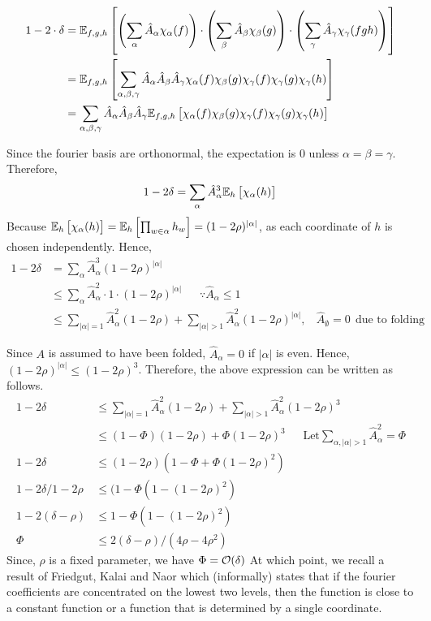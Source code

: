 \begin{align*}
  1 - 2 \cdot \delta  &= {\mathbb{E}}_{f,g,h}\left[\left(\sum_\alpha \hat{A}_\alpha\chi_\alpha(f) \right) \cdot \left(\sum_\beta \hat{A}_\beta\chi_\beta(g) \right) \cdot \left(\sum_\gamma \hat{A}_\gamma\chi_\gamma(fgh)\right)\right]\\
 &={\mathbb{E}}_{f,g,h}\left[\sum_{\alpha,\beta,\gamma}\hat{A}_\alpha\hat{A}_\beta\hat{A}_\gamma\chi_\alpha(f) \chi_\beta(g) \chi_\gamma(f) \chi_\gamma(g) \chi_{\gamma}(h)\right]\\
 &= \sum_{\alpha,\beta,\gamma}\hat{A}_\alpha \hat{A}_\beta \hat{A}_\gamma {\mathbb{E}}_{f,g,h}\left[\chi_\alpha(f) \chi_{\beta}(g) \chi_{\gamma}(f) \chi_{\gamma}(g) \chi_{\gamma}(h)\right]
\end{align*}

\noindent Since the fourier basis are orthonormal, the expectation is $0$ unless $\alpha = \beta = \gamma$. Therefore,
\[
1 - 2\delta = \sum_\alpha \hat{A}_\alpha^3 {\mathbb{E}}_{h}\left[\chi_\alpha(h)\right]\\
\]
\noindent Because ${\mathbb{E}}_{h}\left[\chi_\alpha(h)\right] = {\mathbb{E}}_{h}\left[\prod_{w \in
    \alpha}h_w\right] = (1 - 2\rho)^{|\alpha|}$, as each coordinate of $h$ is
chosen independently. Hence,
\begin{align*}
  1 - 2 \delta &= \sum_{\alpha} \hat{A}_\alpha^3 (1 - 2\rho)^{|\alpha|} \\
  &\le \sum_{\alpha} \hat{A}_\alpha^2 \cdot 1 \cdot (1 - 2\rho)^{|\alpha|} \ \ \ \ \  \ \  \because \hat{A}_\alpha \le 1\\
  &\le \sum_{|\alpha| =1} \hat{A}_\alpha^2 (1 - 2\rho) + \sum_{|\alpha| > 1} \hat{A}_\alpha^2 (1 - 2\rho)^{|\alpha|}, \ \ \  \ \hat{A}_\emptyset = 0 \ \ \mbox{due to folding}
 \end{align*}

 \noindent Since $A$ is assumed to have been folded, $\hat{A}_{\alpha}
 = 0$ if $|\alpha|$ is even. Hence, $(1 - 2\rho)^{|\alpha|} \le (1 -
 2\rho)^{3}$.  Therefore, the above expression can be written as follows.
\begin{align*}
  1 - 2\delta &\le \sum_{|\alpha| =1} \hat{A}_\alpha^2 (1 - 2\rho) + \sum_{|\alpha| > 1} \hat{A}_\alpha^2 (1 - 2\rho)^{3} \\
  & \le (1 -\Phi) (1 - 2\rho) + \Phi ( 1 - 2\rho)^{3} \ \ \ \  \ \ \
  \mbox{Let} \sum_{\alpha, |\alpha| > 1}\hat{A}^2_\alpha = \Phi\\
 1 - 2\delta &\le (1 - 2\rho) (1 - \Phi + \Phi (1 -2 \rho)^2) \\
{1 - 2\delta}/{1 - 2\rho} & \le (1  - \Phi (1 - (1 - 2\rho)^2)\\             
1 - 2(\delta - \rho) & \le 1 - \Phi (1 - (1 - 2\rho)^2)\\
\Phi & \le 2(\delta - \rho)/(4\rho - 4\rho^2)
\end{align*}
\noindent Since, $\rho$ is a fixed parameter, we have $\Phi = {\cal
  O}(\delta)$ At which point, we recall a result of Friedgut, Kalai
and Naor \cite{FKN} which (informally) states that if the fourier
coefficients are concentrated on the lowest two levels, then the
function is close to a constant function or a function that is
determined by a single coordinate.

